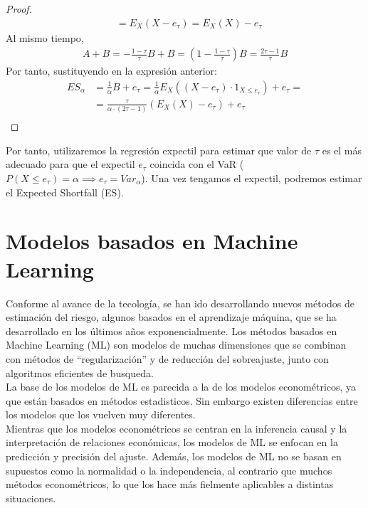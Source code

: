 \documentclass[11pt]{book}
\theoremstyle{plain} %
\theoremstyle{definition} %
\begin{document}
\begin{proof}
\begin{align*}
      &= E_{X}(X-e_\tau) = E_{X}(X) - e_\tau
   \end{align*}
   Al mismo tiempo, 
   \begin{align*}
      A+B = -\frac{1-\tau}{\tau}B + B = \left(1 - \frac{1-\tau}{\tau}\right)B = \frac{2\tau-1}{\tau}B 
   \end{align*}
   Por tanto, sustituyendo en la expresión anterior:
   \begin{align*}
      ES_\alpha &= \frac{1}{\alpha}B + e_\tau = \frac{1}{\alpha}E_{X}((X-e_\tau)\cdot 1_{X \leq e_\tau}) + e_\tau = \\
      &= \frac{\tau}{\alpha \cdot (2\tau-1)} (E_X(X)-e_\tau)+e_\tau \\
   \end{align*}

\end{proof}
Por tanto, utilizaremos la regresión expectil para estimar que valor de $\tau$
es el más adecuado para que el expectil $e_\tau$ coincida con el VaR 
($P(X \leq e_\tau) = \alpha \implies e_\tau = Var_\alpha$). Una vez tengamos 
el expectil, podremos estimar el Expected Shortfall (ES).

\section{Modelos basados en Machine Learning}
Conforme al avance de la tecología, se han ido desarrollando nuevos métodos de 
estimación del riesgo, algunos basados en el aprendizaje máquina, que se ha desarrollado 
en los últimos años exponencialmente. Los métodos basados en Machine Learning (ML) 
son modelos de muchas dimensiones que se combinan con métodos de “regularización” y 
de reducción del sobreajuste, junto con algoritmos eficientes de busqueda.\\

La base de los modelos de ML es parecida a la de los modelos econométricos, ya que están 
basados en métodos estadisticos. Sin embargo existen diferencias entre los modelos que 
los vuelven muy diferentes.\\

Mientras que los modelos econométricos se centran en la inferencia causal y la 
interpretación de relaciones económicas, los modelos de ML se enfocan en la predicción 
y precisión del ajuste. Además, los modelos de ML no se basan en supuestos como la 
normalidad o la independencia, al contrario que muchos métodos econométricos, lo que 
los hace más fielmente aplicables a distintas situaciones. \\
\end{document}
